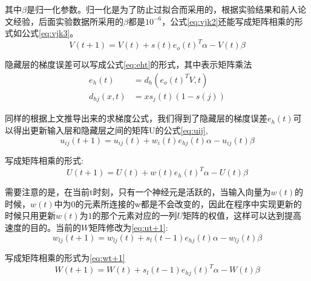其中$\beta$是归一化参数。归一化是为了防止过拟合而采用的，根据实验结果和前人论文经验，后面实验数据所采用的$\beta$都是$10^{-6}$，公式\ref{eq:vjk2}还能写成矩阵相乘的形式如公式\ref{eq:vjk3}。
\begin{equation}
	\label{eq:vjk3}
   	V\left( {t + 1} \right) = V\left( t \right) + s\left( t \right){e_o}{\left( t \right)^T}\alpha  - V\left( t \right)\beta 
\end{equation}

隐藏层的梯度误差可以写成公式\ref{eq:eht}的形式，其中表示矩阵乘法
\begin{equation}
	\label{eq:eht}
   	\begin{split}
{e_h}\left( t \right) &= {d_h}\left( {{e_o}{{\left( t \right)}^T}V,t} \right)\\
{d_{hj}}(x,t) &= x{s_j}\left( t \right)\left( {1 - s\left( j \right)} \right)
	\end{split}
\end{equation}

同样的根据上文推导出来的求梯度公式，我们得到了隐藏层的梯度误差${e_h}(t)$可以得出更新输入层和隐藏层之间的矩阵U的公式\ref{eq:uij},
\begin{equation}
	\label{eq:uij}
   	{u_{ij}}\left( {t + 1} \right) = {u_{ij}}\left( t \right) + {w_i}\left( t \right){e_{hj}}\left( t \right)\alpha  - {u_{ij}}\left( t \right)\beta 
\end{equation}

写成矩阵相乘的形式:
\begin{equation}
	\label{eq:ut+1}
	U\left( {t + 1} \right) = U\left( t \right) + w\left( t \right){e_h}{\left( t \right)^T}\alpha  - U\left( t \right)\beta 
\end{equation}

需要注意的是，在当前t时刻，只有一个神经元是活跃的，当输入向量为$w(t)$的时候，$w(t)$中为$0$的元素所连接的w都是不会改变的，因此在程序中实现更新的时候只用更新$w(t)$为$1$的那个元素对应的一列$U$矩阵的权值，这样可以达到提高速度的目的。当前的$W$矩阵修改为\ref{eq:ut+1}:
\begin{equation}
	\label{eq:sigmoid2}
	{w_{lj}}\left( {t + 1} \right) = {w_{lj}}\left( t \right) + {s_l}\left( {t - 1} \right){e_{hj}}\left( t \right)\alpha  - {w_{lj}}\left( t \right)\beta 
\end{equation}
	
写成矩阵相乘的形式为\ref{eq:wt+1}
\begin{equation}
	\label{eq:wt+1}
   	W\left( {t + 1} \right) = W\left( t \right) + {s_l}\left( {t - 1} \right){e_{hj}}{\left( t \right)^T}\alpha  - W\left( t \right)\beta 
\end{equation}


